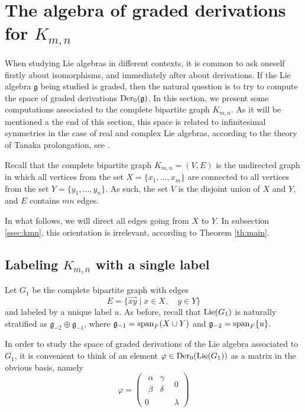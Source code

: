 \documentclass[12pt]{amsart}
\begin{document}
\section{The algebra of graded derivations for $K_{m,n}$}\label{sec:Kmn}

When studying Lie algebras in different contexts, it is common to ask oneself firstly about isomorphisms, and immediately after about derivations. If the Lie algebra ${\mathfrak g}$ being studied is graded, then the natural question is to try to compute the space of graded derivations ${\rm Der}_0({\mathfrak g})$. In this section, we present some computations associated to the complete bipartite graph $K_{m,n}$. As it will be mentioned a the end of this section, this space is related to infinitesimal symmetries in the case of real and complex Lie algebras, according to the theory of Tanaka prolongation, see \cite{tanaka}.

Recall that the complete bipartite graph $K_{m,n}=(V,E)$ is the undirected graph in which all vertices from the set $X=\{x_{1},\hdots,x_m\}$ are connected to all vertices from the set $Y=\{y_{1},\hdots,y_{n}\}$. As such, the set $V$ is the disjoint union of $X$ and $Y$, and $E$ contains $mn$ edges. 

In what follows, we will direct all edges going from $X$ to $Y$. In subsection \ref{ssec:kmn}, this orientation is irrelevant, according to Theorem \ref{th:main}.

\subsection{Labeling $K_{m,n}$ with a single label}

\noindent Let $G_{1}$ be the complete bipartite graph with edges 
\[
E=\{\overrightarrow{xy}\mid x\in X,\quad y\in Y\}
\]
and labeled by a unique label $u$. As before, recall that ${\rm Lie}(G_1)$ is naturally stratified as ${\mathfrak g}_{-2}\oplus{\mathfrak g}_{-1}$, where ${\mathfrak g}_{-1}={\rm span}_F(X\cup Y)$ and ${\mathfrak g}_{-2}={\rm span}_F\{u\}$.

In order to study the space of graded derivations of the Lie algebra associated to $G_1$, it is convenient to think of an element $\varphi\in{\rm Der}_0({\rm Lie}(G_1))$ as a matrix in the obvious basis, namely
\[
\varphi=\left(\begin{array}{c|c}\begin{array}{c|c}\alpha&\gamma\\\hline\beta&\delta\end{array}&0\\\hline0&\lambda\end{array}\right)
\]
\end{document}
